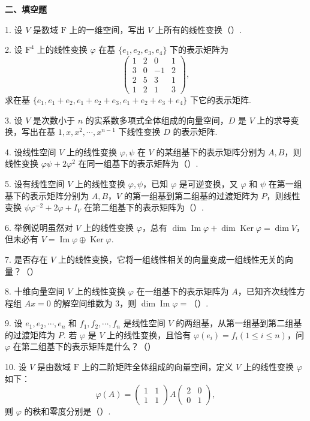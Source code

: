 \documentclass[UTF8, 12pt, fontset=fandol, oneside]{ctexart}
\begin{document}
\noindent\textbf{二、填空题}

1. 设 $V$ 是数域 $\mathrm{F}$ 上的一维空间，写出 $V$ 上所有的线性变换（\quad）.

2. 设 $\mathrm{F}^4$ 上的线性变换 $\varphi$ 在基 $\{e_1,e_2,e_3,e_4\}$ 下的表示矩阵为
\[
\left(\begin{array}{rrrr}
1 & 2 & 0 & 1\\
3 & 0 & -1 & 2\\
2 & 5 & 3 & 1\\
1 & 2 & 1 & 3
\end{array}\right),
\]
求在基 $\{e_1,e_1+e_2,e_1+e_2+e_3,e_1+e_2+e_3+e_4\}$ 下它的表示矩阵.

3. 设 $V$ 是次数小于 $n$ 的实系数多项式全体组成的向量空间，$D$ 是 $V$ 上的求导变换，写出在基 $1,x,x^2,\cdots,x^{n-1}$ 下线性变换 $D$ 的表示矩阵.

4. 设线性空间 $V$ 上的线性变换 $\varphi,\psi$ 在 $V$ 的某组基下的表示矩阵分别为 $A,B$，则线性变换 $\varphi\psi+2\varphi^2$ 在同一组基下的表示矩阵为（\quad）.

5. 设有线性空间 $V$ 上的线性变换 $\varphi,\psi$，已知 $\varphi$ 是可逆变换，又 $\varphi$ 和 $\psi$ 在第一组基下的表示矩阵分别为 $A,B$，$V$ 的第一组基到第二组基的过渡矩阵为 $P$，则线性变换 $\psi\varphi^{-2}+2\varphi+I_V$ 在第二组基下的表示矩阵为（\quad）.

6. 举例说明虽然对 $V$ 上的线性变换 $\varphi$，总有 $\dim\operatorname{Im}\varphi+\dim\operatorname{Ker}\varphi=\dim V$，但未必有 $V=\operatorname{Im}\varphi\oplus\operatorname{Ker}\varphi$.

7. 是否存在 $V$ 上的线性变换，它将一组线性相关的向量变成一组线性无关的向量？（\quad）

8. 十维向量空间 $V$ 上的线性变换 $\varphi$ 在一组基下的表示矩阵为 $A$，已知齐次线性方程组 $Ax=0$ 的解空间维数为 3，则 $\dim\operatorname{Im}\varphi=$（\quad）.

9. 设 $e_1,e_2,\cdots,e_n$ 和 $f_1,f_2,\cdots,f_n$ 是线性空间 $V$ 的两组基，从第一组基到第二组基的过渡矩阵为 $P$. 若 $\varphi$ 是 $V$ 上的线性变换，且恰有 $\varphi(e_i)=f_i(1\le i\le n)$，问 $\varphi$ 在第二组基下的表示矩阵是什么？（\quad）

10. 设 $V$ 是由数域 $\mathrm{F}$ 上的二阶矩阵全体组成的向量空间，定义 $V$ 上的线性变换 $\varphi$ 如下：
\[
\varphi(A)=\left(\begin{array}{cc}1&1\\1&1\end{array}\right)
A
\left(\begin{array}{cc}2&0\\0&1\end{array}\right),
\]
则 $\varphi$ 的秩和零度分别是（\quad）.
\end{document}
